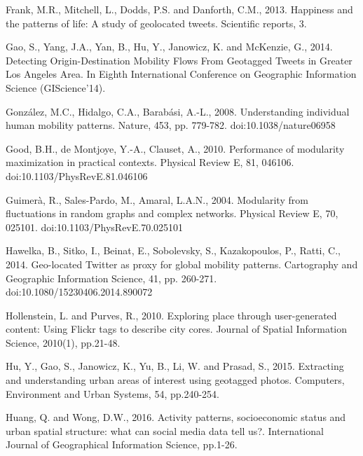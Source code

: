 \documentclass[]{tGIS2e}
\begin{document}
\begin{thebibliography}{9}
Frank, M.R., Mitchell, L., Dodds, P.S. and Danforth, C.M., 2013. Happiness and the patterns of life: A study of geolocated tweets. Scientific reports, 3.

Gao, S., Yang, J.A., Yan, B., Hu, Y., Janowicz, K. and McKenzie, G., 2014. Detecting Origin-Destination Mobility Flows From Geotagged Tweets in Greater Los Angeles Area. In Eighth International Conference on Geographic Information Science (GIScience'14).

González, M.C., Hidalgo, C.A., Barabási, A.-L., 2008. Understanding individual human mobility patterns. Nature, 453, pp. 779-782. doi:10.1038/nature06958

Good, B.H., de Montjoye, Y.-A., Clauset, A., 2010. Performance of modularity maximization in practical contexts. Physical Review E, 81, 046106. doi:10.1103/PhysRevE.81.046106

Guimerà, R., Sales-Pardo, M., Amaral, L.A.N., 2004. Modularity from fluctuations in random graphs and complex networks. Physical Review E, 70, 025101. doi:10.1103/PhysRevE.70.025101

Hawelka, B., Sitko, I., Beinat, E., Sobolevsky, S., Kazakopoulos, P., Ratti, C., 2014. Geo-located Twitter as proxy for global mobility patterns. Cartography and Geographic Information Science, 41, pp. 260-271. doi:10.1080/15230406.2014.890072

Hollenstein, L. and Purves, R., 2010. Exploring place through user-generated content: Using Flickr tags to describe city cores. Journal of Spatial Information Science, 2010(1), pp.21-48.

Hu, Y., Gao, S., Janowicz, K., Yu, B., Li, W. and Prasad, S., 2015. Extracting and understanding urban areas of interest using geotagged photos. Computers, Environment and Urban Systems, 54, pp.240-254.

Huang, Q. and Wong, D.W., 2016. Activity patterns, socioeconomic status and urban spatial structure: what can social media data tell us?. International Journal of Geographical Information Science, pp.1-26.


\end{thebibliography}
\end{document}
